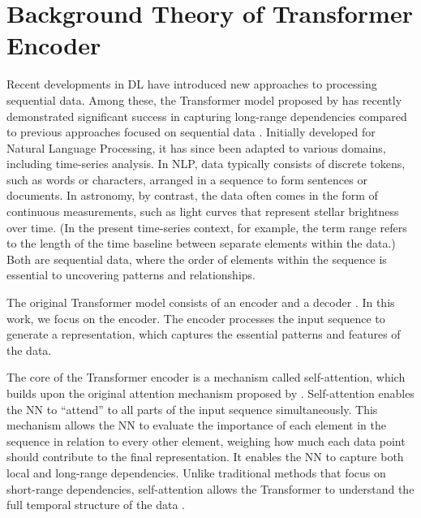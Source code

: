 \section{Background Theory of Transformer Encoder}
\label{sec:background}


Recent developments in DL have introduced new approaches to processing sequential data. Among these, the Transformer model proposed by \cite{vaswani2017attention} has recently demonstrated significant success in capturing long-range dependencies compared to previous approaches focused on sequential data \citep{hawkins2004problem, lakew2018comparison, karita2019comparative}.  Initially developed for Natural Language Processing, it has since been adapted to various domains, including time-series analysis. In NLP, data typically consists of discrete tokens, such as words or characters, arranged in a sequence to form sentences or documents. In astronomy, by contrast, the data often comes in the form of continuous measurements, such as light curves that represent stellar brightness over time. (In the present time-series context, for example, the term range refers to the length of the time baseline between separate elements within the data.) Both are sequential data, where the order of elements within the sequence is essential to uncovering patterns and relationships. \par

The original Transformer model consists of an encoder and a decoder \citep{vaswani2017attention}. In this work, we focus on the encoder. The encoder processes the input sequence to generate a representation, which captures the essential patterns and features of the data. \par

The core of the Transformer encoder is a mechanism called self-attention, which builds upon the original attention mechanism proposed by \cite{bahdanau2014neural}. Self-attention enables the NN to ``attend'' to all parts of the input sequence simultaneously. This mechanism allows the NN to evaluate the importance of each element in the sequence in relation to every other element, weighing how much each data point should contribute to the final representation. It enables the NN to capture both local and long-range dependencies. Unlike traditional methods that focus on short-range dependencies, self-attention allows the Transformer to understand the full temporal structure of the data \citep{lakew2018comparison, karita2019comparative}. \par


